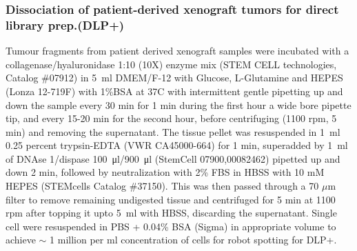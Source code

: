 \documentclass{article}
\begin{document}
\subsubsection{Dissociation of patient-derived xenograft tumors for direct library prep.(DLP+)}

Tumour fragments from patient derived xenograft samples were incubated with a collagenase/hyaluronidase 1:10 (10X) enzyme mix (STEM CELL technologies, Catalog \#07912) in  \SI{5}{\ml} DMEM/F-12 with Glucose, L-Glutamine and HEPES (Lonza 12-719F) with 1\%BSA at 37C with intermittent gentle pipetting up and down the sample every 30 min for 1 min during the first hour a wide bore pipette tip, 
and every 15-20 min for the second hour, before centrifuging (1100 rpm, 5 min) and removing the supernatant.
The tissue pellet was resuspended in \SI{1}{\ml} 0.25 percent trypsin-EDTA (VWR CA45000-664) for 1 min, 
superadded by \SI{1}{\ml} of DNAse 1/dispase \SI{100}{\ul}/\SI{900}{\ul} (StemCell 07900,00082462) pipetted up and down 2 min, followed by neutralization with 2\% FBS in HBSS with 10 mM HEPES (STEMcells Catalog \#37150). 
This was then passed through a 70 $\mu$m filter to remove remaining undigested tissue and centrifuged for 5 min at 1100 rpm after topping it upto \SI{5}{\ml} with HBSS, discarding the supernatant.
Single cell were resuspended in PBS + 0.04\% BSA (Sigma) in appropriate volume to achieve $\sim$ 1 million per ml concentration of cells for robot spotting for DLP+.
\end{document}

